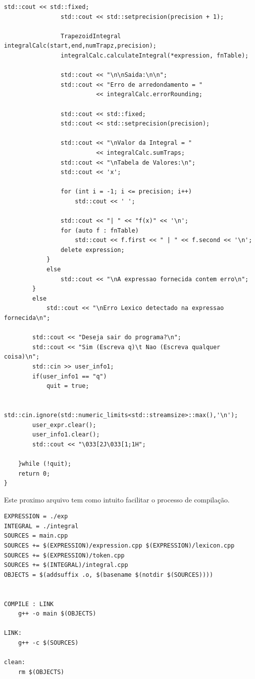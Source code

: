 \documentclass[14pt, letterpaper]{article}
\newcommand\tabd[1][0.2cm]{\hspace*{#1}}
\begin{document}
\begin{lstlisting}[caption=main.cpp]
                std::cout << std::fixed;
                std::cout << std::setprecision(precision + 1);
                
                TrapezoidIntegral integralCalc(start,end,numTrapz,precision);
                integralCalc.calculateIntegral(*expression, fnTable);

                std::cout << "\n\nSaida:\n\n";
                std::cout << "Erro de arredondamento = " 
                          << integralCalc.errorRounding;

                std::cout << std::fixed;
                std::cout << std::setprecision(precision);

                std::cout << "\nValor da Integral = " 
                          << integralCalc.sumTraps;
                std::cout << "\nTabela de Valores:\n";
                std::cout << 'x'; 

                for (int i = -1; i <= precision; i++)
                    std::cout << ' ';

                std::cout << "| " << "f(x)" << '\n';
                for (auto f : fnTable)
                    std::cout << f.first << " | " << f.second << '\n';
                delete expression;
            }
            else
                std::cout << "\nA expressao fornecida contem erro\n";
        }
        else
            std::cout << "\nErro Lexico detectado na expressao fornecida\n";

        std::cout << "Deseja sair do programa?\n";
        std::cout << "Sim (Escreva q)\t Nao (Escreva qualquer coisa)\n";
        std::cin >> user_info1;
        if(user_info1 == "q")
            quit = true;

        std::cin.ignore(std::numeric_limits<std::streamsize>::max(),'\n');
        user_expr.clear();
        user_info1.clear(); 
        std::cout << "\033[2J\033[1;1H";

    }while (!quit); 
    return 0;
}
\end{lstlisting}

\newpage

\tabd Este proximo arquivo tem como intuito facilitar o processo de compilação.
\begin{lstlisting}[caption=Makefile]
EXPRESSION = ./exp
INTEGRAL = ./integral
SOURCES = main.cpp
SOURCES += $(EXPRESSION)/expression.cpp $(EXPRESSION)/lexicon.cpp 
SOURCES += $(EXPRESSION)/token.cpp
SOURCES += $(INTEGRAL)/integral.cpp
OBJECTS = $(addsuffix .o, $(basename $(notdir $(SOURCES))))


COMPILE : LINK 
	g++ -o main $(OBJECTS) 

LINK:
	g++ -c $(SOURCES)

clean:
	rm $(OBJECTS)
  
\end{lstlisting}
\end{document}

